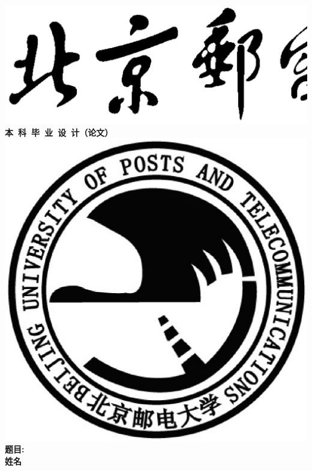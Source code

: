\begin{titlepage}
  \thispagestyle{empty}
  \begin{center}
    \includegraphics[scale=0.25]{buptword.ps}\\
      \vspace*{15mm}
    {\bf\heiti 本~科~毕~业~设~计（论文）}\\
    \vspace*{15mm}
    \includegraphics[scale=0.2]{buptlogo.ps}\\
    \vspace*{15mm}
    {\bf\heiti 题目:~\uline{\makebox[110mm]{}}}\\
    \vspace*{20mm}
    {\bf\songti
      \hspace*{-26mm}
      姓\qquad 名~\uline{\makebox[60mm]{}}\\
}
\end{center}
\end{titlepage}
